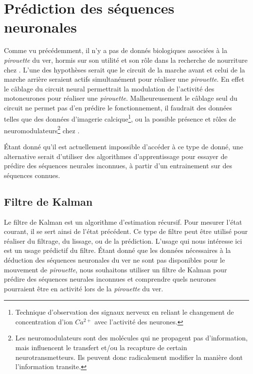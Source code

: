\chapter{Prédiction des séquences neuronales} %
\label{cha:Prédire des séquences neuronales}

Comme vu précédemment, il n'y a pas de donnés biologiques associées à la
\textit{pirouette} du ver, hormis sur son utilité et son rôle dans la recherche
de nourriture chez \celeg{}\cite{Gray2005}. L'une des hypothèses serait que le
circuit de la marche avant et celui de la marche arrière seraient actifs
simultanément pour réaliser une \textit{pirouette}. En effet le câblage du
circuit neural permettrait la modulation de l'activité des motoneurones pour
réaliser une \textit{pirouette}. Malheureusement le câblage seul du circuit ne
permet pas d'en prédire le fonctionnement, il faudrait des données telles que
des données d'imagerie calcique\footnote{Technique d'observation des signaux
nerveux en reliant le changement de concentration d'ion $Ca^{2+}$ avec
l'activité des neurones.}, ou la possible présence et rôles de
neuromodulateurs\footnote{Les neuromodulateurs sont des molécules qui ne
propagent pas d'information, mais influencent le transfert et/ou la recapture
de certain neurotransmetteurs. Ils peuvent donc radicalement modifier la
manière dont l'information transite.} chez \celeg{}.

Étant donné qu'il est actuellement impossible d'accéder à ce type de donné, une
alternative serait d'utiliser des algorithmes d'apprentissage pour essayer de
prédire des séquences neurales inconnues, à partir d'un entrainement sur des
séquences connues.

\section{Filtre de Kalman} %
\label{sec:Filtre de Kalman}

Le filtre de Kalman est un algorithme d'estimation récursif. Pour mesurer
l'état courant, il se sert ainsi de l'état précédent. Ce type de filtre peut
être utilisé pour réaliser du filtrage, du lissage, ou de la prédiction.
L'usage qui nous intéresse ici est un usage prédictif du filtre. Étant donné
que les données nécessaires à la déduction des séquences neuronales du ver ne
sont pas disponibles pour le mouvement de \textit{pirouette}, nous souhaitons
utiliser un filtre de Kalman pour prédire des séquences neurales inconnues et
comprendre quels neurones pourraient être en activité lors de la
\textit{pirouette} du ver.


